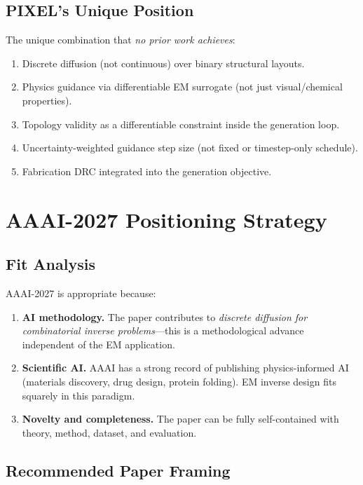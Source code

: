 \documentclass[12pt,a4paper]{article}
\theoremstyle{definition}
\theoremstyle{plain}
\theoremstyle{remark}
\begin{document}
\subsection{PIXEL's Unique Position}

The unique combination that \emph{no prior work achieves}:
\begin{enumerate}
  \item Discrete diffusion (not continuous) over binary structural layouts.
  \item Physics guidance via differentiable EM surrogate (not just visual/chemical properties).
  \item Topology validity as a differentiable constraint inside the generation loop.
  \item Uncertainty-weighted guidance step size (not fixed or timestep-only schedule).
  \item Fabrication DRC integrated into the generation objective.
\end{enumerate}

\section{AAAI-2027 Positioning Strategy}
\label{sec:aaai}

\subsection{Fit Analysis}

AAAI-2027 is appropriate because:
\begin{enumerate}
  \item \textbf{AI methodology.}
        The paper contributes to \emph{discrete diffusion for combinatorial inverse
        problems}—this is a methodological advance independent of the EM application.
  \item \textbf{Scientific AI.}
        AAAI has a strong record of publishing physics-informed AI
        (materials discovery, drug design, protein folding).
        EM inverse design fits squarely in this paradigm.
  \item \textbf{Novelty and completeness.}
        The paper can be fully self-contained with theory, method, dataset, and evaluation.
\end{enumerate}

\subsection{Recommended Paper Framing}
\end{document}
